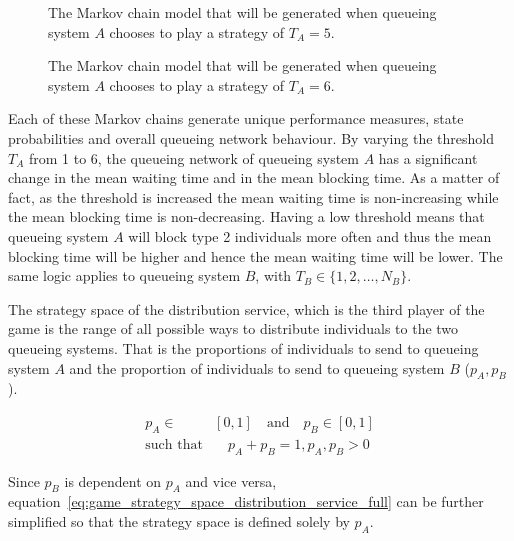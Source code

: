 \begin{figure}[H]
    \centering
    \scalebox{0.8}{
        
    }
    \caption{The Markov chain model that will be generated when queueing system
    \(A\) chooses to play a strategy of \(T_A = 5\).}
\end{figure}

\begin{figure}[H]
    \centering
    \scalebox{0.8}{
        
    }
    \caption{The Markov chain model that will be generated when queueing system
    \(A\) chooses to play a strategy of \(T_A = 6\).}
    \label{fig:game_strategy_visualisation_N_6_M_3_last}
\end{figure}

Each of these Markov chains generate unique performance measures, state
probabilities and overall queueing network behaviour.
By varying the threshold \(T_A\) from 1 to 6, the queueing network of queueing
system \(A\) has a significant change in the mean waiting time and in the mean
blocking time.
As a matter of fact, as the threshold is increased the mean waiting time is
non-increasing while the mean blocking time is non-decreasing.
Having a low threshold means that queueing system \(A\) will block type 2
individuals more often and thus the mean blocking time will be higher and
hence the mean waiting time will be lower.
The same logic applies to queueing system \(B\), with
\(T_B \in \{1, 2, \ldots, N_B\}\).

The strategy space of the distribution service, which is the third player of the
game is the range of all possible ways to distribute individuals to the two
queueing systems.
That is the proportions of individuals to send to queueing system \(A\) and the
proportion of individuals to send to queueing system \(B\) (\(p_A, p_B\)).

\begin{align}
    p_A \in & [0, 1] \quad \text{and} \quad p_B \in [0, 1] \nonumber \\
    \text{such that} & \quad p_A + p_B = 1, p_A, p_B > 0
    \label{eq:game_strategy_space_distribution_service_full}
\end{align}

Since \(p_B\) is dependent on \(p_A\) and vice versa,
equation~\eqref{eq:game_strategy_space_distribution_service_full} can be further
simplified so that the strategy space is defined solely by \(p_A\).

